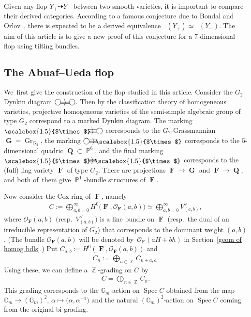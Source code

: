 \documentclass[pdftex]{sigma}
\DeclareMathOperator{\D}{D^b}
\DeclareMathOperator{\F}{\mathbf{F}}
\newcommand{\Gm}{\mathbb{G}_{m}}
\DeclareMathOperator{\Gr}{Gr}
\DeclareMathOperator{\G}{\mathbf{G}}
\DeclareMathOperator{\PP}{\mathbb{P}}
\DeclareMathOperator{\Q}{\mathbf{Q}}
\DeclareMathOperator{\Spec}{Spec}
\DeclareMathOperator{\ZZ}{\mathbb{Z}}
\newcommand{\stsh}{\mathcal{O}}
\newcommand{\waheyheyarrow}{\equiv\hspace{-0.25em}\rangle\hspace{-0.55em}\equiv}
\newcommand{\waheyheytimes}{\lower0.3ex\hbox{\scalebox{1.5}{$\times$}}}
\numberwithin{equation}{section}
\begin{document}
Given any flop $Y_+ \dashrightarrow Y_-$ between two smooth varieties,
it is important to compare their derived categories.
According to a famous conjecture due to Bondal and Orlov~\cite{BO02}, there is expected to be a derived equivalence $\D(Y_+) \simeq \D(Y_-)$.
The aim of this article is to give a new proof of this conjecture for a $7$-dimensional flop using tilting bundles.

\subsection{The Abuaf--Ueda flop}
We~first give the construction of the flop studied in this article.
Consider the $G_2$ Dynkin diagram $\bigcirc\hspace{-0.45em}\waheyheyarrow\hspace{-0.45em}\bigcirc$.
Then by the classification theory of homogeneous varieties, projective homogeneous varieties of the semi-simple algebraic group of type $G_2$
correspond to a marked Dynkin diagram.
The marking $\waheyheytimes\hspace{-0.7em}\waheyheyarrow\hspace{-0.45em}\bigcirc$ corresponds to the $G_2$-Grassmannian
$\G = \Gr_{G_2}$,
the marking $\bigcirc\hspace{-0.45em}\waheyheyarrow\hspace{-0.7em}\waheyheytimes$ corresponds to the $5$-dimensional quadric $\Q \subset \PP^6$,
and the final marking $\waheyheytimes\hspace{-0.7em}\waheyheyarrow\hspace{-0.7em}\waheyheytimes$
corresponds to the (full) flag variety $\F$ of type $G_2$.
There are projections $\F \to \G$ and $\F \to \Q$, and both of~them give $\PP^1$-bundle structures of $\F$.

Now consider the Cox ring of $\F$, namely
\begin{gather*}
C := \bigoplus_{a, b = 0}^{\infty} H^0\big(\F, \stsh_{\F}(a, b)\big) \simeq \bigoplus_{a, b = 0}^{\infty} V_{(a, b)}^{\vee},
\end{gather*}
where $\stsh_{\F}(a, b)$ $\big($resp.~$V_{(a, b)}^{\vee}\big)$ is a line bundle on $\F$ (resp.~the dual of an irreducible representation of $G_2$)
that corresponds to the dominant weight $(a, b)$.
(The bundle $\stsh_{\F}(a, b)$ will be denoted by~$\stsh_{\F}(aH + bh)$ in Section~\ref{geom of homog bdls}.)
Put $C_{a, b} := H^0(\F, \stsh_{\F}(a, b))$ and
\begin{gather*}
C_n := \bigoplus_{a \in \ZZ} C_{n + a, a}.
\end{gather*}
Using these, we can define a $\ZZ$-grading on $C$ by
\begin{gather*}
C = \bigoplus_{n \in \ZZ} C_n.
\end{gather*}
This grading corresponds to the $\Gm$-action on $\Spec C$ obtained from the map $\Gm \to (\Gm)^2$, $\alpha \mapsto \big(\alpha, \alpha^{-1}\big)$
and the natural $(\Gm)^2$-action on $\Spec C$ coming from the original bi-grading.
\end{document}
